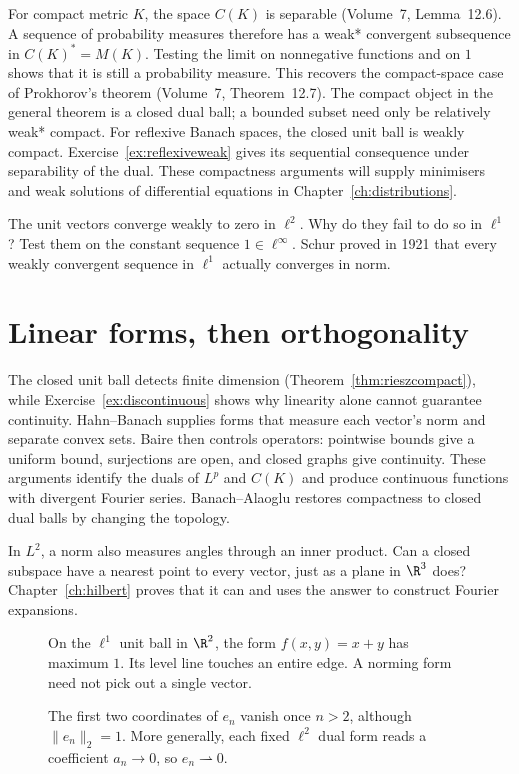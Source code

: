 For compact metric $K$, the space $C(K)$ is separable (Volume~7, Lemma~12.6). A sequence of probability measures therefore has a weak* convergent subsequence in $C(K)^*=M(K)$. Testing the limit on nonnegative functions and on $1$ shows that it is still a probability measure. This recovers the compact-space case of Prokhorov's theorem (Volume~7, Theorem~12.7). The compact object in the general theorem is a closed dual ball; a bounded subset need only be relatively weak* compact. For reflexive Banach spaces, the closed unit ball is weakly compact. Exercise~\ref{ex:reflexiveweak} gives its sequential consequence under separability of the dual. These compactness arguments will supply minimisers and weak solutions of differential equations in Chapter~\ref{ch:distributions}.

\begin{think}
The unit vectors converge weakly to zero in $\ell^2$. Why do they fail to do so in $\ell^1$? Test them on the constant sequence $1\in\ell^\infty$. Schur proved in 1921 that every weakly convergent sequence in $\ell^1$ actually converges in norm.
\end{think}

\section{Linear forms, then orthogonality}

The closed unit ball detects finite dimension (Theorem~\ref{thm:rieszcompact}), while Exercise~\ref{ex:discontinuous} shows why linearity alone cannot guarantee continuity. Hahn--Banach supplies forms that measure each vector's norm and separate convex sets. Baire then controls operators: pointwise bounds give a uniform bound, surjections are open, and closed graphs give continuity. These arguments identify the duals of $L^p$ and $C(K)$ and produce continuous functions with divergent Fourier series. Banach--Alaoglu restores compactness to closed dual balls by changing the topology.

In $L^2$, a norm also measures angles through an inner product. Can a closed subspace have a nearest point to every vector, just as a plane in $\R^3$ does? Chapter~\ref{ch:hilbert} proves that it can and uses the answer to construct Fourier expansions.

\begin{figure}[ht]
\centering{}
\caption{On the $\ell^1$ unit ball in $\R^2$, the form $f(x,y)=x+y$ has maximum $1$. Its level line touches an entire edge. A norming form need not pick out a single vector.}\label{fig:v8c01dual}
\end{figure}
\begin{figure}[ht]
\centering{}
\caption{The first two coordinates of $e_n$ vanish once $n>2$, although $\|e_n\|_2=1$. More generally, each fixed $\ell^2$ dual form reads a coefficient $a_n\to0$, so $e_n\rightharpoonup0$.}\label{fig:v8c01coords}
\end{figure}

